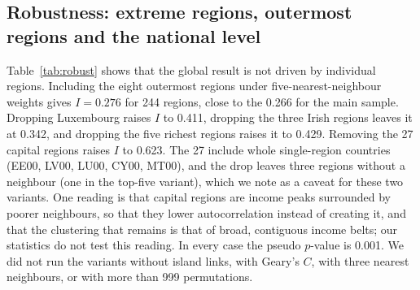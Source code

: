 \documentclass[11pt]{article}
\begin{document}
\subsection{Robustness: extreme regions, outermost regions and the national level}

Table~\ref{tab:robust} shows that the global result is not driven by individual regions. Including the eight outermost regions under five-nearest-neighbour weights gives $I=0.276$ for 244 regions, close to the 0.266 for the main sample.
Dropping Luxembourg raises $I$ to 0.411, dropping the three Irish regions leaves it at 0.342, and dropping the five richest regions raises it to 0.429.
Removing the 27 capital regions raises $I$ to 0.623. The 27 include whole single-region countries (EE00, LV00, LU00, CY00, MT00), and the drop leaves three regions without a neighbour (one in the top-five variant), which we note as a caveat for these two variants.
One reading is that capital regions are income peaks surrounded by poorer neighbours, so that they lower autocorrelation instead of creating it, and that the clustering that remains is that of broad, contiguous income belts; our statistics do not test this reading.
In every case the pseudo $p$-value is 0.001. We did not run the variants without island links, with Geary's $C$, with three nearest neighbours, or with more than 999 permutations.
\end{document}
